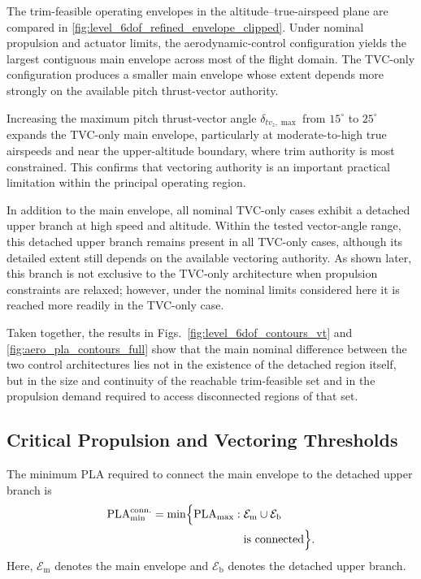 \documentclass[conf]{new-aiaa}
\begin{document}
The trim-feasible operating envelopes in the altitude--true-airspeed plane are compared in \autoref{fig:level_6dof_refined_envelope_clipped}. Under nominal propulsion and actuator limits, the aerodynamic-control configuration yields the largest contiguous main envelope across most of the flight domain. The TVC-only configuration produces a smaller main envelope whose extent depends more strongly on the available pitch thrust-vector authority.

Increasing the maximum pitch thrust-vector angle $\delta_{tv_z,\max}$ from $15^\circ$ to $25^\circ$ expands the TVC-only main envelope, particularly at moderate-to-high true airspeeds and near the upper-altitude boundary, where trim authority is most constrained. This confirms that vectoring authority is an important practical limitation within the principal operating region.

In addition to the main envelope, all nominal TVC-only cases exhibit a detached upper branch at high speed and altitude. Within the tested vector-angle range, this detached upper branch remains present in all TVC-only cases, although its detailed extent still depends on the available vectoring authority. As shown later, this branch is not exclusive to the TVC-only architecture when propulsion constraints are relaxed; however, under the nominal limits considered here it is reached more readily in the TVC-only case.

Taken together, the results in Figs.~\ref{fig:level_6dof_contours_vt} and \ref{fig:aero_pla_contours_full} show that the main nominal difference between the two control architectures lies not in the existence of the detached region itself, but in the size and continuity of the reachable trim-feasible set and in the propulsion demand required to access disconnected regions of that set.

\subsection{Critical Propulsion and Vectoring Thresholds}
The minimum PLA required to connect the main envelope to the detached upper branch is
\begin{equation}
\begin{aligned}
\mathrm{PLA}_{\min}^{\mathrm{conn.}}
=
\min \Bigl\{
\mathrm{PLA}_{\max}
:\;
&\mathcal{E}_{\mathrm{m}} \cup \mathcal{E}_{\mathrm{b}} \\
&\text{is connected}
\Bigr\}.
\end{aligned}
\label{eq:pla_connect}
\end{equation}
Here, $\mathcal{E}_{\mathrm{m}}$ denotes the main envelope and $\mathcal{E}_{\mathrm{b}}$ denotes the detached upper branch.
\end{document}
